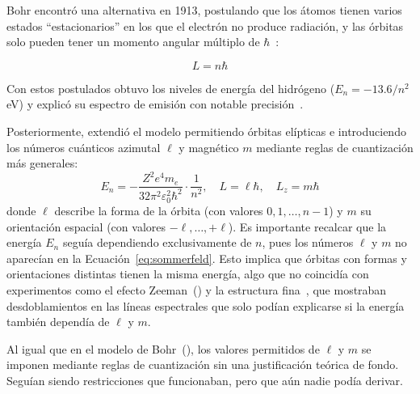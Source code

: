 \documentclass[11pt,a4paper,spanish]{book}
\begin{document}
Bohr encontró una alternativa en 1913, postulando que los átomos
tienen varios estados ``estacionarios'' en los que el electrón no
produce radiación, y las órbitas solo pueden tener un momento angular
múltiplo de \(\hbar\)~\citep{bohr1913}:

\begin{equation}
  L = n \hbar
  \label{eq:angular_momentum_rutherford}
\end{equation}

Con estos postulados obtuvo los niveles de energía del hidrógeno
(\(E_n = -13.6/n^2\) eV) y explicó su espectro de emisión con notable
precisión~\citep{bohr1913}.

Posteriormente, \cite{sommerfeld1916} extendió el modelo permitiendo
órbitas elípticas e introduciendo los números cuánticos azimutal
\(\ell\) y magnético \(m\) mediante reglas de cuantización más generales:
\begin{equation}
  E_n = -\frac{Z^2 e^4 m_e}{32\pi^2 \varepsilon_0^2 \hbar^2} \cdot
  \frac{1}{n^2}, \quad L = \ell\hbar, \quad L_z = m\hbar
  \label{eq:sommerfeld}
\end{equation}
donde \(\ell\) describe la forma de la órbita (con valores \(0, 1,
\ldots, n-1\)) y \(m\) su orientación espacial (con valores \(-\ell,
\ldots, +\ell\)). Es importante recalcar que la energía \(E_n\)
seguía dependiendo exclusivamente de \(n\), pues los números \(\ell\)
y \(m\) no aparecían en la Ecuación~\ref{eq:sommerfeld}. Esto implica
que órbitas con formas y orientaciones distintas tienen la misma
energía, algo que no coincidía con experimentos como el efecto
Zeeman~(\citeyear{zeeman1897}) y la estructura
fina~\citep{sommerfeld1916}, que mostraban desdoblamientos en las líneas
espectrales que solo podían explicarse si la energía también dependía
de \(\ell\) y \(m\).

Al igual que en el modelo de Bohr~(\citeyear{bohr1913}), los valores
permitidos de \(\ell\)
y \(m\) se imponen mediante reglas de cuantización sin una
justificación teórica de fondo. Seguían siendo restricciones que
funcionaban, pero que aún nadie podía derivar.
\end{document}
